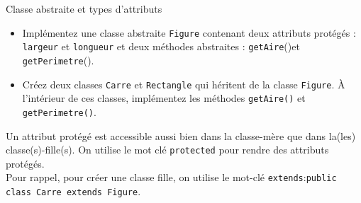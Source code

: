 	
	\begin{Exercice}[15 minutes]{Classe abstraite et types d'attributs}
	\begin{itemize}
		\item Implémentez une classe abstraite \lstinline{Figure} contenant deux attributs protégés : \lstinline{largeur} et \lstinline{longueur} et deux méthodes abstraites : \lstinline{getAire}()et \lstinline{getPerimetre}().
		\item Créez deux classes \lstinline{Carre} et \lstinline{Rectangle} qui héritent de la classe \lstinline{Figure}. À l'intérieur de ces classes, implémentez les méthodes \lstinline{getAire()} et \lstinline{getPerimetre()}.
	\end{itemize}
	
	\begin{conseil}
		Un attribut protégé est accessible aussi bien dans la classe-mère que dans la(les) classe(s)-fille(s). On utilise le mot clé \lstinline{protected} pour rendre des attributs protégés. \\
		Pour rappel, pour créer une classe fille, on utilise le mot-clé \lstinline{extends}:\lstinline{public class Carre extends Figure}.
	\end{conseil}
	
	
	\begin{solution}
	 
	\end{solution}
	\end{Exercice}
	
